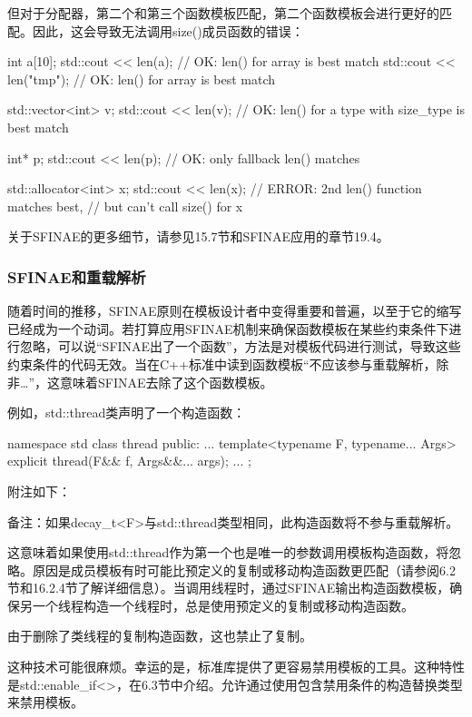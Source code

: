 但对于分配器，第二个和第三个函数模板匹配，第二个函数模板会进行更好的匹配。因此，这会导致无法调用size()成员函数的错误：

\begin{cpp}
int a[10];
std::cout << len(a); // OK: len() for array is best match
std::cout << len("tmp"); // OK: len() for array is best match

std::vector<int> v;
std::cout << len(v); // OK: len() for a type with size_type is best match

int* p;
std::cout << len(p); // OK: only fallback len() matches

std::allocator<int> x;
std::cout << len(x); // ERROR: 2nd len() function matches best,
					 // but can't call size() for x
\end{cpp}

关于SFINAE的更多细节，请参见15.7节和SFINAE应用的章节19.4。

\subsubsection{SFINAE和重载解析}

随着时间的推移，SFINAE原则在模板设计者中变得重要和普遍，以至于它的缩写已经成为一个动词。若打算应用SFINAE机制来确保函数模板在某些约束条件下进行忽略，可以说“SFINAE出了一个函数”，方法是对模板代码进行测试，导致这些约束条件的代码无效。当在C++标准中读到函数模板“不应该参与重载解析，除非…”，这意味着SFINAE去除了这个函数模板。

例如，std::thread类声明了一个构造函数：

\begin{cpp}
namespace std {
class thread {
public:
	...
	template<typename F, typename... Args>
	explicit thread(F&& f, Args&&... args);
	...
};
}
\end{cpp}

附注如下：

备注：如果decay\_t<F>与std::thread类型相同，此构造函数将不参与重载解析。

这意味着如果使用std::thread作为第一个也是唯一的参数调用模板构造函数，将忽略。原因是成员模板有时可能比预定义的复制或移动构造函数更匹配（请参阅6.2节和16.2.4节了解详细信息）。当调用线程时，通过SFINAE输出构造函数模板，确保另一个线程构造一个线程时，总是使用预定义的复制或移动构造函数。

\begin{notice}
由于删除了类线程的复制构造函数，这也禁止了复制。
\end{notice}

这种技术可能很麻烦。幸运的是，标准库提供了更容易禁用模板的工具。这种特性是std::enable\_if<>，在6.3节中介绍。允许通过使用包含禁用条件的构造替换类型来禁用模板。

